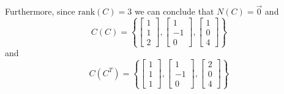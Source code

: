 \begin{mdframed}[style=MyFrame]
    Furthermore, since $\text{rank}(C)=3$ we can conclude that
    $N(C)=\vec{0}$ and 
        \begin{equation}
            C(C) =
            \left\{
            \begin{bmatrix}
                1   \\
                1   \\
                2
            \end{bmatrix},
            \begin{bmatrix}
                1   \\
                -1  \\
                0
            \end{bmatrix},
            \begin{bmatrix}
                1   \\
                0  \\
                4
            \end{bmatrix}
            \right\}
        \end{equation}
        and 
        \begin{equation}
            C(C^{T}) =
            \left\{
            \begin{bmatrix}
                1   \\
                1   \\
                1
            \end{bmatrix},
            \begin{bmatrix}
                1   \\
                -1  \\
                0
            \end{bmatrix},
            \begin{bmatrix}
                2   \\
                0  \\
                4
            \end{bmatrix}
            \right\}
    \end{equation}
\end{mdframed}

